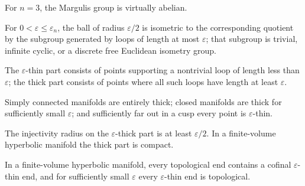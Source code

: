 \begin{remark}
\label{rem:chow-iv-margulis-three-dimensional}
For \(n=3\), the Margulis group is virtually abelian.
\end{remark}

\begin{theorem}
\label{thm:chow-iv-margulis-local}
For \(0<\varepsilon\le\varepsilon_n\), the ball of radius \(\varepsilon/2\) is
isometric to the corresponding quotient by the subgroup generated by loops of
length at most \(\varepsilon\); that subgroup is trivial, infinite cyclic, or
a discrete free Euclidean isometry group.
\end{theorem}

\begin{definition}
\label{def:chow-iv-thick-thin-parts}
The \(\varepsilon\)-thin part consists of points supporting a nontrivial loop
of length less than \(\varepsilon\); the thick part consists of points where
all such loops have length at least \(\varepsilon\).
\end{definition}

\begin{example}
\label{ex:chow-iv-thick-thin-examples}
Simply connected manifolds are entirely thick; closed manifolds are thick for
sufficiently small \(\varepsilon\); and sufficiently far out in a cusp every
point is \(\varepsilon\)-thin.
\end{example}

\begin{lemma}
\label{lem:chow-iv-thick-injectivity-radius}
The injectivity radius on the \(\varepsilon\)-thick part is at least
\(\varepsilon/2\).  In a finite-volume hyperbolic manifold the thick part is
compact.
\end{lemma}

\begin{lemma}
\label{lem:chow-iv-topological-ends-thin}
In a finite-volume hyperbolic manifold, every topological end contains a
cofinal \(\varepsilon\)-thin end, and for sufficiently small \(\varepsilon\)
every \(\varepsilon\)-thin end is topological.
\end{lemma}

